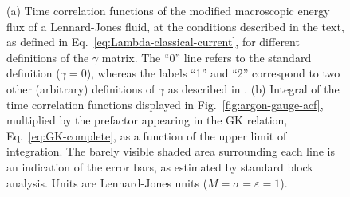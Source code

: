 \begin{figure}
    \begin{center}
    \end{center}
	\caption{(a) Time correlation functions of the modified macroscopic energy flux of a Lennard-Jones fluid, at the conditions described in the text, as defined in Eq.~\eqref{eq:Lambda-classical-current}, for different definitions of the $\gamma$ matrix. The ``0'' line refers to the standard definition ($\gamma = 0$), whereas the labels ``1'' and ``2'' correspond to two other (arbitrary) definitions of $\gamma$ as described in \cite{Ercole2016}.
    (b) Integral of the time correlation functions displayed in Fig.~\ref{fig:argon-gauge-acf}, multiplied by the prefactor appearing in the GK relation, Eq.~\eqref{eq:GK-complete}, as a function of the upper limit of integration. The barely visible shaded area surrounding each line is an indication of the error bars, as estimated by standard block analysis. Units are Lennard-Jones units ($M=\sigma=\varepsilon=1$). \label{fig:argon-gauge}}
\end{figure}

